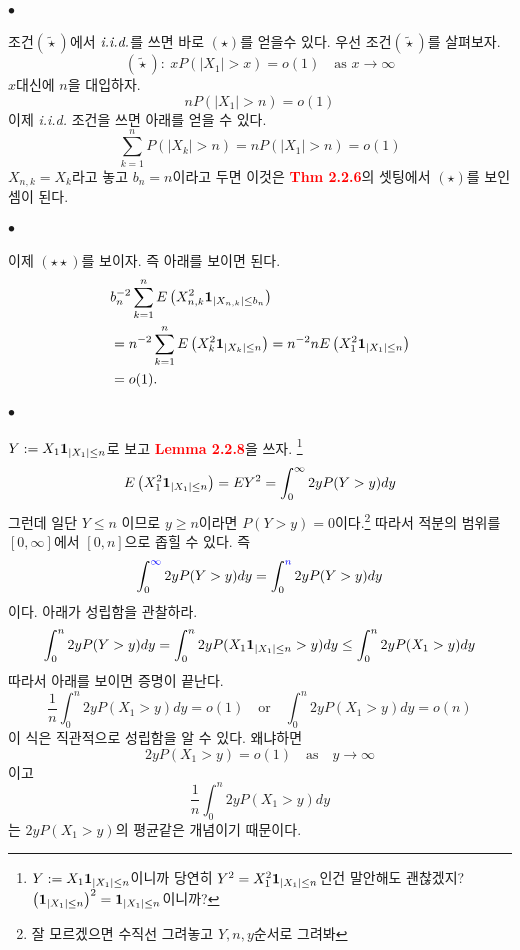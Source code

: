 \documentclass[12pt,oneside,english,a4paper]{article}
\def\ck{\paragraph{\Large$\bullet$}\Large}
\begin{document}
\ck 조건$(\tilde\star)$에서 $\emph{i.i.d.}$를 쓰면 바로 $(\star)$를 얻을수 있다. 우선 조건$(\tilde\star)$를 살펴보자. 
\[
(\tilde\star): ~xP(|X_1|>x)=o(1) \quad \mbox{as $x \to \infty$} 
\]
$x$대신에 $n$을 대입하자. 
\[
nP(|X_1|>n)=o(1)
\]
이제 \emph{i.i.d.} 조건을 쓰면 아래를 얻을 수 있다. 
\[
\sum_{k=1}^{n}P\left(|X_k|>n\right)=nP\left(|X_1|>n\right)=o(1)
\]
$X_{n,k}=X_k$라고 놓고 $b_n=n$이라고 두면 이것은 \textbf{\textcolor{red}{Thm 2.2.6}}의 셋팅에서 $(\star)$를 보인셈이 된다. 

\ck 이제 $(\star\star)$를 보이자. 즉 아래를 보이면 된다. 
\begin{align*}
&b_n^{-2}\sum_{k=1}^{n}E\left(X_{n,k}^2{\bf 1}_{|X_{n,k}|\leq b_n }\right) \\
&=n^{-2}\sum_{k=1}^{n}E\left(X_{k}^2{\bf 1}_{|X_{k}|\leq n }\right)=n^{-2}nE\left(X_1^2{\bf 1}_{|X_1|\leq n}\right)\\
&=o(1).
\end{align*}

\ck $Y:=X_1{\bf 1}_{|X_1|\leq n}$로 보고 \textbf{\textcolor{red}{Lemma 2.2.8}}을 쓰자. \footnote{$Y:=X_1{\bf 1}_{|X_1|\leq n}$이니까 당연히 $Y^2=X_1^2{\bf 1}_{|X_1|\leq n}$인건 말안해도 괜찮겠지? $\big({\bf 1}_{|X_1|\leq n}\big)^2={\bf 1}_{|X_1|\leq n}$이니까?}
\[
E\left(X_1^2{\bf 1}_{|X_1|\leq n}\right)=EY^2=\int_0^{\infty}2yP(Y>y)dy
\]
그런데 일단 $Y\leq n$ 이므로 $y\geq n$이라면 $P(Y>y)=0$이다.\footnote{잘 모르겠으면 수직선 그려놓고 $Y,n,y$순서로 그려봐} 따라서 적분의 범위를 $[0,\infty]$에서 $[0,n]$으로 좁힐 수 있다. 즉 
\begin{align*}
\int_0^{\textcolor{blue}{\infty}}2yP(Y>y)dy=\int_0^{\textcolor{blue}{n}}2yP(Y>y)dy
\end{align*}
이다. 아래가 성립함을 관찰하라. 
\[
\int_0^{n}2yP(Y>y)dy=\int_0^{n}2yP(X_1{\bf 1}_{|X_1|\leq n}>y)dy\leq\int_0^{n}2yP(X_1>y)dy
\]
따라서 아래를 보이면 증명이 끝난다. 
\[
\frac{1}{n}\int_0^{n}2yP(X_1>y)dy=o(1) \quad \mbox{or} \quad \int_0^{n}2yP(X_1>y)dy=o(n)
\]
이 식은 직관적으로 성립함을 알 수 있다. 왜냐하면 
\[
2yP(X_1>y) = o(1) \quad \mbox{as} \quad y\to \infty
\]
이고 
\[
\frac{1}{n}\int_0^n 2yP(X_1>y)dy
\]
는 $2yP(X_1>y)$의 평균같은 개념이기 때문이다. 
\end{document}
